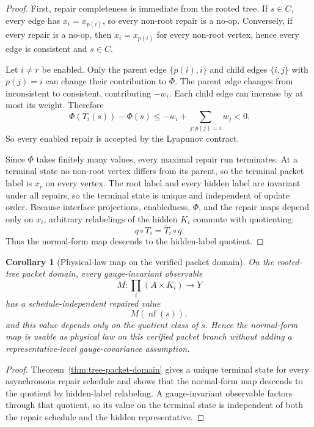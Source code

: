 \documentclass[11pt]{article}
\newtheorem{corollary}[theorem]{Corollary}
\theoremstyle{remark}
\theoremstyle{plain}
\begin{document}
\begin{proof}
First, repair completeness is immediate from the rooted tree. If \(s\in C\), every edge has
\(x_i=x_{p(i)}\), so every non-root repair is a no-op. Conversely, if every repair is a no-op,
then \(x_i=x_{p(i)}\) for every non-root vertex, hence every edge is consistent and \(s\in C\).

Let \(i\ne r\) be enabled. Only the parent edge \(\{p(i),i\}\) and child edges
\(\{i,j\}\) with \(p(j)=i\) can change their contribution to \(\Phi\). The parent edge changes
from inconsistent to consistent, contributing \(-w_i\). Each child edge can increase by at most
its weight. Therefore
\[
\Phi(T_i(s))-\Phi(s)
\le
-w_i+\sum_{j:p(j)=i}w_j
<0.
\]
So every enabled repair is accepted by the Lyapunov contract.

Since \(\Phi\) takes finitely many values, every maximal repair run terminates. At a terminal
state no non-root vertex differs from its parent, so the terminal packet label is \(x_r\) on every
vertex. The root label and every hidden label are invariant under all repairs, so the terminal
state is unique and independent of update order. Because interface projections, enabledness,
\(\Phi\), and the repair maps depend only on \(x_i\), arbitrary relabelings of the hidden
\(K_i\) commute with quotienting:
\[
q\circ T_i=\overline T_i\circ q.
\]
Thus the normal-form map descends to the hidden-label quotient.
\end{proof}

\begin{corollary}[Physical-law map on the verified packet domain]\label{cor:tree-packet-law}
On the rooted-tree packet domain, every gauge-invariant observable
\[
M:\prod_i(A\times K_i)\to Y
\]
has a schedule-independent repaired value
\[
M(\operatorname{nf}(s)),
\]
and this value depends only on the quotient class of \(s\). Hence the normal-form map is
usable as physical law on this verified packet branch without adding a representative-level
gauge-covariance assumption.
\end{corollary}

\begin{proof}
Theorem~\ref{thm:tree-packet-domain} gives a unique terminal state for every asynchronous repair
schedule and shows that the normal-form map descends to the quotient by hidden-label relabeling.
A gauge-invariant observable factors through that quotient, so its value on the terminal state is
independent of both the repair schedule and the hidden representative.
\end{proof}
\end{document}

